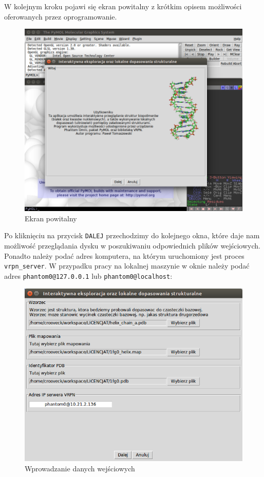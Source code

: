 \documentclass[licencjacka]{pracamgr}
\begin{document}
W kolejnym kroku pojawi się ekran powitalny z krótkim opisem możliwości oferowanych przez oprogramowanie.

\begin{figure}[H]
\centering
\includegraphics[scale=0.55,center]{explorer_hello_pl}
\caption{Ekran powitalny}
\end{figure}

Po kliknięciu na przycisk \texttt{DALEJ} przechodzimy do kolejnego okna, które daje nam możliwość przeglądania dysku w poszukiwaniu odpowiednich plików wejściowych. Ponadto należy podać adres komputera, na którym uruchomiony jest proces \texttt{vrpn\_server}. W przypadku pracy na lokalnej maszynie w oknie należy podać adres \texttt{phantom0@127.0.0.1} lub \texttt{phantom0@localhost}:

\begin{figure}[H]
\centering
\includegraphics[scale=0.7,center]{explorer_files_pl}
\caption{Wprowadzanie danych wejściowych}
\end{figure}
\end{document}
